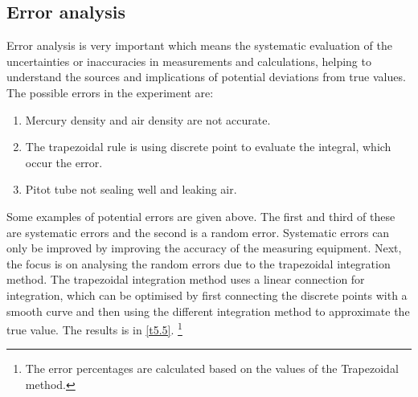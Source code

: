 \subsection*{Error analysis}
Error analysis is very important which means the systematic evaluation of the uncertainties or inaccuracies in measurements and calculations, helping to understand the sources and implications of potential deviations from true values.
The possible errors in the experiment are:
\begin{enumerate}
    \item Mercury density and air density are not accurate.
    \item The trapezoidal rule is using discrete point to evaluate the integral, which occur the error.
    \item Pitot tube not sealing well and leaking air.
\end{enumerate}
Some examples of potential errors are given above. The first and third of these are systematic errors and the second is a random error.
Systematic errors can only be improved by improving the accuracy of the measuring equipment. Next, the focus is on analysing the random errors due to the trapezoidal integration method.
The trapezoidal integration method uses a linear connection for integration, which can be optimised by first connecting the discrete points with a smooth curve and then using the different integration method to approximate the true value. The results is in \autoref{t5.5}.    \footnote{The error percentages are calculated based on the values of the Trapezoidal method.}

\begin{table}[htbp]
    \caption{Different integration method to calculate $C_L$}  
    \label{t5.5}
    \centering
    \end{table}

    \vspace{2cm}